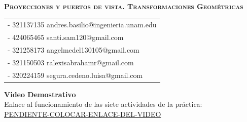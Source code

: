 \documentclass[a4paper, 11pt]{article}
\begin{document}
\newpage

\begin{center}
    \vspace{50cm}
    {\Large\scshape\textbf{Proyecciones y puertos de vista. Transformaciones Geométricas}}\\[.5in]
\end{center}

\begin{tabular}[t]{l}
    - 321137135 andres.basilio@ingenieria.unam.edu \\[0.5cm]
    - 424065465 santi.sam120@gmail.com \\[0.5cm]
    - 321258173 angelmedel130105@gmail.com\\[0.5cm]
    - 321150503 ralexisabrahamr@gmail.com \\[0.5cm]
    - 320224159 segura.cedeno.luisa@gmail.com \\[0.5cm]
\end{tabular} 

\newpage









\vspace{1.5cm}
\begin{center}
    \Large\textbf{Video Demostrativo} \\[0.5cm]
    \normalsize
    Enlace al funcionamiento de las siete actividades de la práctica: \\[0.3cm]
    \url{PENDIENTE-COLOCAR-ENLACE-DEL-VIDEO}
\end{center}
\end{document}

